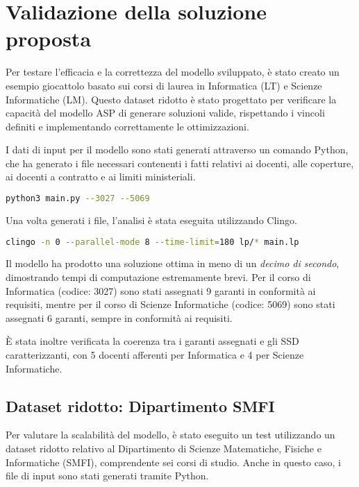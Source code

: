 \section{Validazione della soluzione proposta}
\label{sec:expval}

Per testare l'efficacia e la correttezza del modello sviluppato, è stato creato un esempio 
giocattolo basato sui corsi di laurea in Informatica (LT) e Scienze Informatiche (LM). 
Questo dataset ridotto è stato progettato per verificare la capacità del modello ASP di 
generare soluzioni valide, rispettando i vincoli definiti e implementando correttamente 
le ottimizzazioni.

I dati di input per il modello sono stati generati attraverso un comando Python, che ha 
generato i file necessari contenenti i fatti relativi ai docenti, alle coperture, ai 
docenti a contratto e ai limiti ministeriali.

\begin{lstlisting}[language=bash]
 python3 main.py --3027 --5069
\end{lstlisting}

Una volta generati i file, l'analisi è stata eseguita utilizzando Clingo.

\begin{lstlisting}[language=bash]
 clingo -n 0 --parallel-mode 8 --time-limit=180 lp/* main.lp
\end{lstlisting}

Il modello ha prodotto una soluzione ottima in meno di un \textit{decimo di secondo}, 
dimostrando tempi di computazione estremamente brevi. Per il corso di Informatica 
(codice: 3027) sono stati assegnati 9 garanti in conformità ai requisiti, mentre per il corso di 
Scienze Informatiche (codice: 5069) sono stati assegnati 6 garanti, sempre in conformità ai 
requisiti.

È stata inoltre verificata la coerenza tra i garanti assegnati e gli SSD caratterizzanti, 
con 5 docenti afferenti per Informatica e 4 per Scienze Informatiche.

\subsection{Dataset ridotto: Dipartimento SMFI}
\label{sec:-dataset-dipartimento-smfi}

Per valutare la scalabilità del modello, è stato eseguito un test utilizzando un dataset 
ridotto relativo al Dipartimento di Scienze Matematiche, Fisiche e Informatiche (SMFI), 
comprendente sei corsi di studio. Anche in questo caso, i file di input sono stati generati 
tramite Python.

